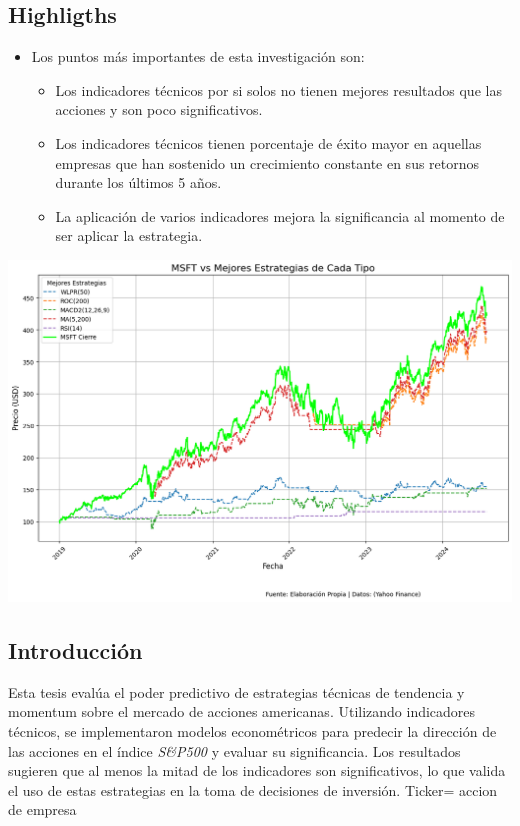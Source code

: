 \documentclass[a0,portrait]{a0poster}
\newcommand{\customsection}[1]{
    \begin{center}
        \begin{tcolorbox}[colframe=miRojo!50, colback=miRojo, width=\linewidth, boxrule=1mm, arc=3mm, auto outer arc]
            \centering
            \vspace{.5cm} %
            \color{white}
            \section*{ \textbf{\Huge #1}}  %
            \vspace{.2cm} %
        \end{tcolorbox}
    \end{center}
}
\begin{document}
\begin{multicols}{2}
    \customsection{Highligths}
    \begin{multicols}{2}
            \begin{itemize}
                \item Los puntos más importantes de esta investigación son:
                \begin{itemize}
                    \item Los indicadores técnicos por si solos no tienen mejores resultados que las acciones y son poco significativos.
                    \item Los indicadores técnicos tienen porcentaje de éxito mayor en aquellas empresas que han sostenido un crecimiento constante en sus retornos durante los últimos 5 años.
                    \item La aplicación de varios indicadores mejora la significancia al momento de ser aplicar la estrategia.
                    
                \end{itemize}
            \end{itemize}
            \columnbreak
    \begin{minipage}{\linewidth}
        \centering
        \includegraphics[width=0.9\linewidth]{grafico_mejores_estrategias_MSFT.png}
                \end{minipage}
       
        \end{multicols}
    \customsection{Introducción}
    \par
    \normalsize
    Esta tesis evalúa el poder predictivo de estrategias técnicas de tendencia y momentum sobre el mercado de acciones americanas.
    Utilizando indicadores técnicos, se implementaron modelos econométricos para predecir la dirección de las acciones en el 
    índice \textit{S\&P500} y evaluar su significancia. Los resultados sugieren que al menos la mitad de los indicadores son significativos, lo que valida el uso 
    de estas estrategias en la toma de decisiones de inversión.
    Ticker= accion de empresa


\end{multicols}
\end{document}
